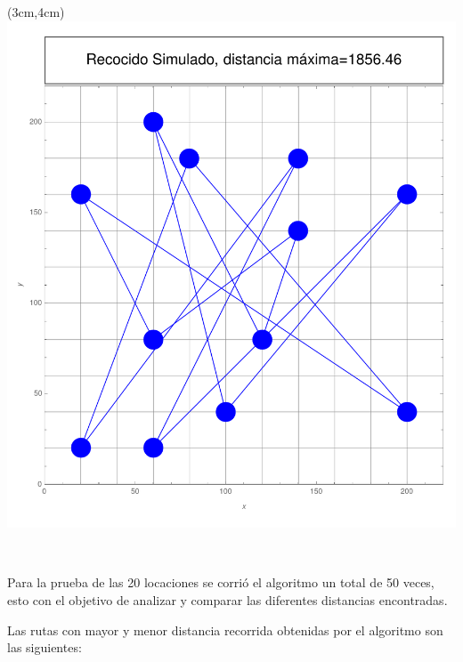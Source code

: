 \documentclass[11pt, table]{report}
\begin{document}
{\begin{textblock*}{\textwidth}(3cm,4cm)
\includegraphics[scale=0.65]{recocido_simulado_max.pdf}
\end{textblock*}


\ 

\pagebreak

Para la prueba de las 20 locaciones se corrió el algoritmo un total de 50 veces, esto con el objetivo de analizar y comparar las diferentes distancias encontradas.

Las rutas con mayor y menor distancia recorrida obtenidas por el algoritmo son las siguientes:\\

}
\end{document}
